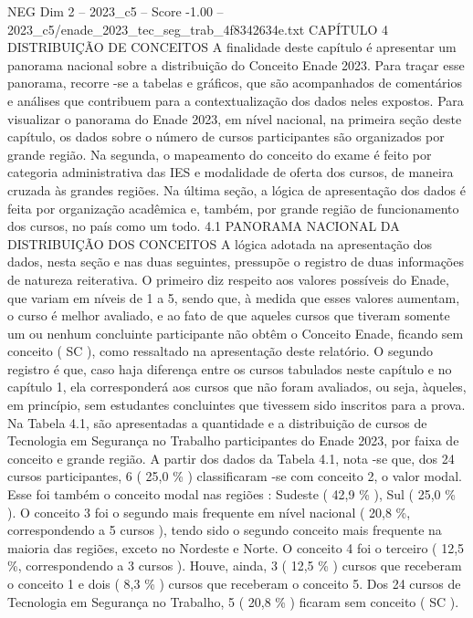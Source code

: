 \begin{textsample}{NEG Dim 2 – 2023\_c5 – Score -1.00 – 2023\_c5/enade\_2023\_tec\_seg\_trab\_4f8342634e.txt}  \label{ex:f2_neg_172}
CAPÍTULO 4 DISTRIBUIÇÃO DE CONCEITOS A finalidade deste capítulo é apresentar um panorama nacional sobre a distribuição do Conceito Enade 2023.
Para traçar esse panorama, recorre -se a tabelas e gráficos, que são acompanhados de comentários e análises que contribuem para a contextualização dos dados neles expostos.
Para visualizar o panorama do Enade 2023, em nível nacional, na primeira seção deste capítulo, os dados sobre o número de cursos participantes são organizados por grande região.
Na segunda, o mapeamento do conceito do exame é feito por categoria administrativa das IES e modalidade de oferta dos cursos, de maneira cruzada às grandes regiões.
Na última seção, a lógica de apresentação dos dados é feita por organização acadêmica e, também, por grande região de funcionamento dos cursos, no país como um todo. 4.1 PANORAMA NACIONAL DA DISTRIBUIÇÃO DOS CONCEITOS A lógica adotada na apresentação dos dados, nesta seção e nas duas seguintes, pressupõe o registro de duas informações de natureza reiterativa.
O primeiro diz respeito aos valores possíveis do Enade, que variam em níveis de 1 a 5, sendo que, à medida que esses valores aumentam, o curso é melhor avaliado, e ao fato de que aqueles cursos que tiveram somente um ou nenhum concluinte participante não obtêm o Conceito Enade, ficando sem conceito ( SC ), como ressaltado na apresentação deste relatório.
O segundo registro é que, caso haja diferença entre os cursos tabulados neste capítulo e no capítulo 1, ela corresponderá aos cursos que não foram avaliados, ou seja, àqueles, em princípio, sem estudantes concluintes que tivessem sido inscritos para a prova.
Na Tabela 4.1, são apresentadas a quantidade e a distribuição de cursos de Tecnologia em Segurança no Trabalho participantes do Enade 2023, por faixa de conceito e grande região.
A partir dos dados da Tabela 4.1, nota -se que, dos 24 cursos participantes, 6 ( 25,0 \% ) classificaram -se com conceito 2, o valor modal.
Esse foi também o conceito modal nas regiões : Sudeste ( 42,9 \% ), Sul ( 25,0 \% ).
O conceito 3 foi o segundo mais frequente em nível nacional ( 20,8 \%, correspondendo a 5 cursos ), tendo sido o segundo conceito mais frequente na maioria das regiões, exceto no Nordeste e Norte.
O conceito 4 foi o terceiro ( 12,5 \%, correspondendo a 3 cursos ).
Houve, ainda, 3 ( 12,5 \% ) cursos que receberam o conceito 1 e dois ( 8,3 \% ) cursos que receberam o conceito 5.
Dos 24 cursos de Tecnologia em Segurança no Trabalho, 5 ( 20,8 \% ) ficaram sem conceito ( SC ).

\end{textsample}
